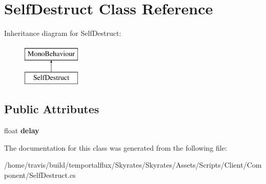 \hypertarget{class_self_destruct}{\section{Self\-Destruct Class Reference}
\label{class_self_destruct}
}
Inheritance diagram for Self\-Destruct\-:\begin{figure}[H]
\begin{center}
\leavevmode
\includegraphics[height=2.000000cm]{class_self_destruct}
\end{center}
\end{figure}
\subsection*{Public Attributes}
\begin{DoxyCompactItemize}
\item 
\hypertarget{class_self_destruct_afc23fc6f8364d3b48c95c85652e2adf5}{float {\bfseries delay}}\label{class_self_destruct_afc23fc6f8364d3b48c95c85652e2adf5}

\end{DoxyCompactItemize}


The documentation for this class was generated from the following file\-:\begin{DoxyCompactItemize}
\item 
/home/travis/build/temportalflux/\-Skyrates/\-Skyrates/\-Assets/\-Scripts/\-Client/\-Component/Self\-Destruct.\-cs\end{DoxyCompactItemize}

